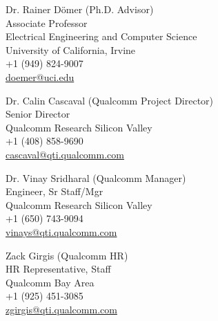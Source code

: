 

%
%
Dr. Rainer D\"{o}mer (Ph.D. Advisor) \\
Associate Professor\\
Electrical Engineering and Computer Science\\
University of California, Irvine\\
+1 (949) 824-9007\\
\href{mailto:doemer@uci.edu}{doemer@uci.edu}\\

\vspace{5mm}

Dr. Calin Cascaval (Qualcomm Project Director)\\
Senior Director\\
Qualcomm Research Silicon Valley \\
+1 (408) 858-9690 \\
\href{mailto:cascaval@qti.qualcomm.com}{cascaval@qti.qualcomm.com}\\

\vspace{5mm}

Dr. Vinay Sridharal (Qualcomm Manager)\\
Engineer, Sr Staff/Mgr\\
Qualcomm Research Silicon Valley \\
+1 (650) 743-9094\\
\href{mailto:vinays@qti.qualcomm.com}{vinays@qti.qualcomm.com}\\

\vspace{5mm}

Zack Girgis (Qualcomm HR)\\
HR Representative, Staff\\ 
Qualcomm Bay Area \\
+1 (925) 451-3085\\
\href{mailto:zgirgis@qti.qualcomm.com}{zgirgis@qti.qualcomm.com}\\

